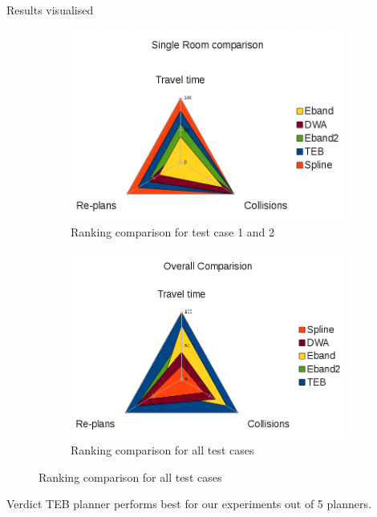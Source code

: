 \documentclass{beamer}
\begin{document}
\begin{frame}[t]{Results visualised}
    \begin{figure}[H]
        \centering
        \begin{subfigure}[b]{0.450\linewidth}
            \centering
            \includegraphics[width=0.99\textwidth]{single_room_web_graph.png}
            \caption{Ranking comparison for test case 1 and 2}
        \end{subfigure}%
        \begin{subfigure}[b]{0.50\linewidth}
            \centering
            \includegraphics[width=0.99\textwidth]{overall_web_graph.png}
            \caption{Ranking comparison for all test cases}
        \end{subfigure}
    \end{figure}
    \begin{block}{Verdict}
        TEB planner performs best for our experiments out of 5 planners.
    \end{block}
\end{frame}
\end{document}
